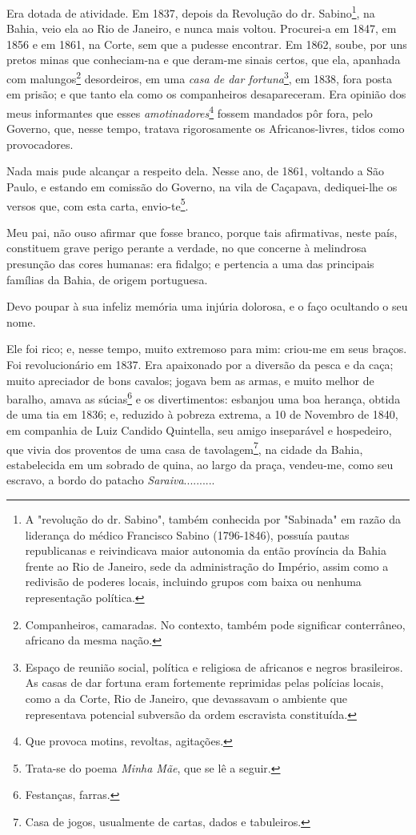 Era dotada de atividade. Em 1837, depois da Revolução do dr.
Sabino\footnote{A "revolução do dr. Sabino", também conhecida por
  "Sabinada" em razão da liderança do médico Francisco Sabino
  (1796-1846), possuía pautas republicanas e reivindicava maior
  autonomia da então província da Bahia frente ao Rio de Janeiro, sede
  da administração do Império, assim como a redivisão de poderes locais,
  incluindo grupos com baixa ou nenhuma representação política.}, na
Bahia, veio ela ao Rio de Janeiro, e nunca mais voltou. Procurei-a em
1847, em 1856 e em 1861, na Corte, sem que a pudesse encontrar. Em 1862,
soube, por uns pretos minas que conheciam-na e que deram-me sinais
certos, que ela, apanhada com malungos\footnote{Companheiros,
  camaradas. No contexto, também pode significar conterrâneo, africano
  da mesma nação.} desordeiros, em uma \emph{casa de dar
fortuna}\footnote{Espaço de reunião social, política e religiosa de
  africanos e negros brasileiros. As casas de dar fortuna eram
  fortemente reprimidas pelas polícias locais, como a da Corte, Rio de
  Janeiro, que devassavam o ambiente que representava potencial
  subversão da ordem escravista constituída.}, em 1838, fora posta em
prisão; e que tanto ela como os companheiros desapareceram. Era opinião
dos meus informantes que esses \emph{amotinadores}\footnote{Que
  provoca motins, revoltas, agitações.} fossem mandados pôr fora, pelo
Governo, que, nesse tempo, tratava rigorosamente os Africanos-livres,
tidos como provocadores.

Nada mais pude alcançar a respeito dela. Nesse ano, de 1861, voltando a
São Paulo, e estando em comissão do Governo, na vila de Caçapava,
dediquei-lhe os versos que, com esta carta, envio-te\footnote{Trata-se
  do poema \emph{Minha Mãe}, que se lê a seguir.}.

Meu pai, não ouso afirmar que fosse branco, porque tais afirmativas,
neste país, constituem grave perigo perante a verdade, no que concerne à
melindrosa presunção das cores humanas: era fidalgo; e pertencia a uma
das principais famílias da Bahia, de origem portuguesa.

Devo poupar à sua infeliz memória uma injúria dolorosa, e o faço
ocultando o seu nome.

Ele foi rico; e, nesse tempo, muito extremoso para mim: criou-me em seus
braços. Foi revolucionário em 1837. Era apaixonado por a diversão da
pesca e da caça; muito apreciador de bons cavalos; jogava bem as armas,
e muito melhor de baralho, amava as súcias\footnote{Festanças, farras.}
e os divertimentos: esbanjou uma boa herança, obtida de uma tia em 1836;
e, reduzido à pobreza extrema, a 10 de Novembro de 1840, em companhia de
Luiz Candido Quintella, seu amigo inseparável e hospedeiro, que vivia
dos proventos de uma casa de tavolagem\footnote{Casa de jogos,
  usualmente de cartas, dados e tabuleiros.}, na cidade da Bahia,
estabelecida em um sobrado de quina, ao largo da praça, vendeu-me, como
seu escravo, a bordo do patacho \emph{Saraiva}..........

